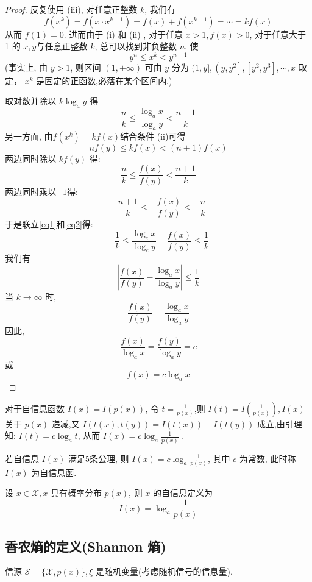\begin{proof}
    反复使用  (iii), 对任意正整数 $ k $, 我们有
$$
f\left(x^{k}\right)=f\left(x \cdot x^{k-1}\right)=f(x)+f\left(x^{k-1}\right)=\cdots=k f(x)
$$
从而 $ f(1)=0 $. 进而由于 (i) 和 (ii) , 对于任意 $ x>1, f(x)>0 $, 对于任意大于 1 的 $ x, y $与任意正整数 $ k $, 总可以找到非负整数 $ n $, 使
$$
y^{n} \leqslant x^{k}<y^{n+1}
$$
(事实上, 由 $ y>1 $, 则区间 $ (1,+\infty) $ 可由 $ y $ 分为 $ (1, y],\left(y, y^{2}\right],\left[y^{2}, y^{3}\right], \cdots, x $ 取定， $ x^{k} $ 是固定的正函数,必落在某个区间内.)


取对数并除以 $ k \log_a y $ 得
\begin{equation}
\frac{n}{k} \leqslant \frac{\log_a x}{\log_a y}<\frac{n+1}{k}\label{eq1}
\end{equation}
另一方面, 由$f\left(x^{k}\right)=k f(x)$结合条件 (ii)可得
$$
n f(y) \leqslant k f(x)<(n+1) f(x)
$$
两边同时除以 $ k f(y) $ 得:
$$
\frac{n}{k} \leqslant \frac{f(x)}{f(y)}<\frac{n+1}{k}
$$
两边同时乘以$-1$得:
\begin{equation}
-\frac{n+1}{k} \leqslant-\frac{f(x)}{f(y)} \leqslant-\frac{n}{k}\label{eq2}
\end{equation}
于是联立\eqref{eq1}和\eqref{eq2}得:
$$
-\frac{1}{k} \leqslant \frac{\log _{c} x}{\log _{c} y}-\frac{f(x)}{f(y)} \leqslant \frac{1}{k}
$$
我们有
$$
\left|\frac{f(x)}{f(y)}-\frac{\log_a x}{\log_a y}\right| \leqslant \frac{1}{k}
$$
当 $ k \rightarrow \infty $ 时,
$$
\frac{f(x)}{f(y)}=\frac{\log_a x}{\log_a y}
$$
因此,
$$
\frac{f(x)}{\log_a x}=\frac{f(y)}{\log_a y}=c
$$
或
$$
f(x)=c \log_a x
$$
\end{proof}
\begin{remark}
  对于自信息函数 $ I(x)=I(p(x)) $, 令 $ t=\frac{1}{p(x)} $,则 $ I(t)=I\left(\frac{1}{p(x)}\right), I(x) $ 关于 $ p(x) $ 递减,又 $ I(t(x), t(y))=I(t(x))+I(t(y)) $ 成立,由引理知: $ I(t)=c \log _{a} t $, 从而 $ I(x)=c \log _{a} \frac{1}{p(x)} $ .
\end{remark}

\begin{theorem}
    若自信息 $ I(x) $ 满足5条公理, 则 $ I(x)=c \log _{a} \frac{1}{p(x)} $, 其中 $ c $ 为常数, 此时称 $ I(x) $ 为自信息函.
\end{theorem}

设 $ x \in \mathscr{X}, x $ 具有概率分布 $ p(x) $, 则 $ x $ 的自信息定义为
$$
I(x)=\log _{a} \frac{1}{p(x)}
$$
\subsection{香农熵的定义(Shannon 熵)}
信源 $ \mathscr{S}=\{\mathscr{X}, p(x)\},  \xi $ 是随机变量(考虑随机信号的信息量).

